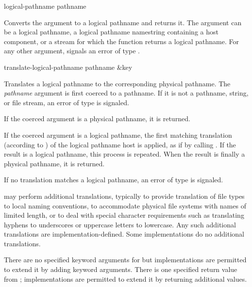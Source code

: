 \begin{defun}[Function]
logical-pathname pathname

    Converts the argument to a logical pathname and returns it.  The
    argument can be a logical pathname, a logical pathname namestring
    containing a host component, or a stream for which the 
    function returns a logical pathname.  For any other argument,
     signals an error of type .
\end{defun}

\begin{defun}[Function]
translate-logical-pathname pathname &key

    Translates a logical pathname to the corresponding physical pathname.
    The \emph{pathname} argument is first coerced to a pathname.  If it is not a
    pathname, string, or file stream, an error of type  is
    signaled.

    If the coerced argument is a physical pathname, it is returned.

    If the coerced argument is a logical pathname, the first matching
    translation (according to ) of the logical pathname
    host is applied, as if by calling .  If the result is
    a logical pathname, this process is repeated.  When the result is
    finally a physical pathname, it is returned.

    If no translation matches a logical pathname,
    an error of type  is signaled.

     may perform additional translations,
    typically to provide translation of file types to local naming
    conventions, to accommodate physical file systems with names of limited length,
    or to deal with special character requirements such as
    translating hyphens to underscores or uppercase letters to lowercase.
    Any such additional translations are implementation-defined.  Some
    implementations do no additional translations.

    There are no specified keyword arguments for
     but implementations are permitted to extend
    it by adding keyword arguments.  There is one specified return value
    from ; implementations are permitted to
    extend it by returning additional values.
\end{defun}

